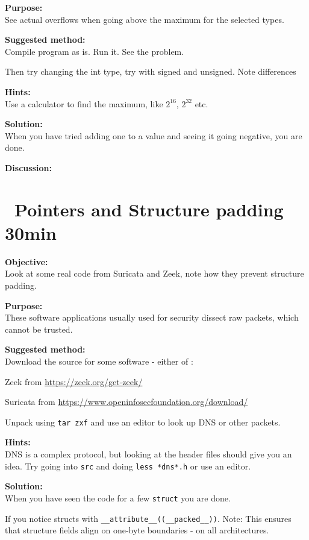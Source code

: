 \documentclass[a4paper,11pt,notitlepage]{report}
\begin{document}
{\bf Purpose:}\\
See actual overflows when going above the maximum for the selected types.


{\bf Suggested method:}\\
Compile program as is. Run it. See the problem.

Then try changing the int type, try with signed and unsigned. Note differences

{\bf Hints:}\\
Use a calculator to find the maximum, like $2^{16}$, $2^{32}$ etc.

{\bf Solution:}\\
When you have tried adding one to a value and seeing it going negative, you are done.

{\bf Discussion:}\\


\chapter{\faExclamationTriangle\ Pointers and Structure padding 30min}
\label{ex:structure-padding}

{\bf Objective:}\\
Look at some real code from Suricata and Zeek, note how they prevent structure padding.

{\bf Purpose:}\\
These software applications usually used for security dissect raw packets, which cannot be trusted.

{\bf Suggested method:}\\
Download the source for some software - either of :
\begin{list2}
\item Zeek from \url{https://zeek.org/get-zeek/}
\item Suricata from \url{https://www.openinfosecfoundation.org/download/}
\end{list2}

Unpack using \verb+tar zxf+ and use an editor to look up DNS or other packets.

{\bf Hints:}\\
DNS is a complex protocol, but looking at the header files should give you an idea. Try going into \verb+src+ and doing \verb+less *dns*.h+ or use an editor.


{\bf Solution:}\\
When you have seen the code for a few \verb+struct+ you are done.

If you notice structs with \verb+__attribute__((__packed__))+. Note: This ensures that structure fields align on one-byte boundaries - on all architectures.
\end{document}
